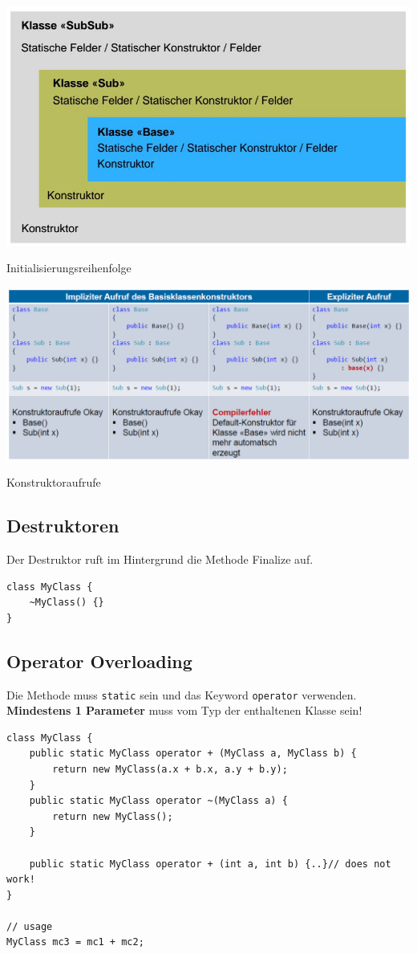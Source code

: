\documentclass[
a4paper,
oneside,
10pt,
fleqn,
headsepline,
toc=listofnumbered, 
bibliography=totocnumbered]{scrartcl}
\begin{document}
\begin{minipage}[t]{1\textwidth}
\centering
\includegraphics[width=0.9\linewidth]{images/initialisierungsreihenfolge}
\caption{Initialisierungsreihenfolge}

\end{minipage}

\begin{minipage}[t]{1\textwidth}
\centering
\includegraphics[width=\linewidth]{images/init_constructors}
\caption{Konstruktoraufrufe}
\end{minipage}

\subsection{Destruktoren}
Der Destruktor ruft im Hintergrund die Methode Finalize auf. 
\begin{lstlisting}
class MyClass {
	~MyClass() {}
}
\end{lstlisting}

\subsection{Operator Overloading}
Die Methode muss \lstinline|static| sein und das Keyword \lstinline|operator| verwenden. \textbf{Mindestens 1 Parameter} muss vom Typ der enthaltenen Klasse sein!
\begin{lstlisting}
class MyClass {
	public static MyClass operator + (MyClass a, MyClass b) {
		return new MyClass(a.x + b.x, a.y + b.y);
	}
	public static MyClass operator ~(MyClass a) {
		return new MyClass();
	}
	
	public static MyClass operator + (int a, int b) {..}// does not work!
}

// usage
MyClass mc3 = mc1 + mc2;
\end{lstlisting}
\end{document}

